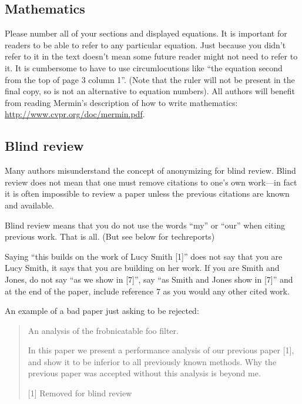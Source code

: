 \message{ !name(egpaper_for_review.tex)}\documentclass[10pt,twocolumn,letterpaper]{article}
\begin{document}
\subsection{Mathematics}

Please number all of your sections and displayed equations.  It is
important for readers to be able to refer to any particular equation.
Just because you didn't refer to it in the text doesn't mean some
future reader might not need to refer to it.  It is cumbersome to have
to use circumlocutions like ``the equation second from the top of page
3 column 1''.  (Note that the ruler will not be present in the final
copy, so is not an alternative to equation numbers).  All authors will
benefit from reading Mermin's description of how to write mathematics:
\url{http://www.cvpr.org/doc/mermin.pdf}.


\subsection{Blind review}

Many authors misunderstand the concept of anonymizing for blind
review.  Blind review does not mean that one must remove citations to
one's own work---in fact it is often impossible to review a paper
unless the previous citations are known and available.

Blind review means that you do not use the words ``my'' or ``our''
when citing previous work.  That is all.  (But see below for
techreports)

Saying ``this builds on the work of Lucy Smith [1]'' does not say that
you are Lucy Smith, it says that you are building on her work.  If you
are Smith and Jones, do not say ``as we show in [7]'', say ``as Smith
and Jones show in [7]'' and at the end of the paper, include reference
7 as you would any other cited work.

An example of a bad paper just asking to be rejected:
\begin{quote}
  \begin{center}
    An analysis of the frobnicatable foo filter.
  \end{center}

  In this paper we present a performance analysis of our previous
  paper [1], and show it to be inferior to all previously known
  methods.  Why the previous paper was accepted without this analysis
  is beyond me.

  [1] Removed for blind review
\end{quote}
\end{document}
